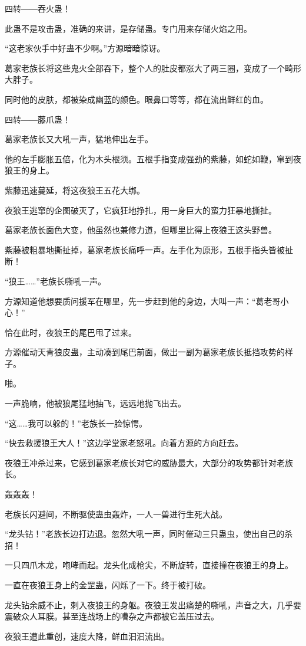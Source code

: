 \begin{this_body}
四转――吞火蛊！

此蛊不是攻击蛊，准确的来讲，是存储蛊。专门用来存储火焰之用。

“这老家伙手中好蛊不少啊。”方源暗暗惊讶。

葛家老族长将这些鬼火全部吞下，整个人的肚皮都涨大了两三圈，变成了一个畸形大胖子。

同时他的皮肤，都被染成幽蓝的颜色。眼鼻口等等，都在流出鲜红的血。

四转――藤爪蛊！

葛家老族长又大吼一声，猛地伸出左手。

他的左手膨胀五倍，化为木头根须。五根手指变成强劲的紫藤，如蛇如鞭，窜到夜狼王的身上。

紫藤迅速蔓延，将这夜狼王五花大绑。

夜狼王逃窜的企图破灭了，它疯狂地挣扎，用一身巨大的蛮力狂暴地撕扯。

葛家老族长面色大变，他虽然也兼修力道，但哪里比得上夜狼王这头野兽。

紫藤被粗暴地撕扯掉，葛家老族长痛呼一声。左手化为原形，五根手指头皆被扯断！

“狼王……”老族长嘶吼一声。

方源知道他想要质问援军在哪里，先一步赶到他的身边，大叫一声：“葛老哥小心！”

恰在此时，夜狼王的尾巴甩了过来。

方源催动天青狼皮蛊，主动凑到尾巴前面，做出一副为葛家老族长抵挡攻势的样子。

啪。

一声脆响，他被狼尾猛地抽飞，远远地抛飞出去。

“这……我可以躲的！”老族长一脸惊愕。

“快去救援狼王大人！”这边学堂家老怒吼。向着方源的方向赶去。

夜狼王冲杀过来，它感到葛家老族长对它的威胁最大，大部分的攻势都针对老族长。

轰轰轰！

老族长闪避间，不断驱使蛊虫轰炸，一人一兽进行生死大战。

“龙头钻！”老族长边打边退。忽然大吼一声，同时催动三只蛊虫，使出自己的杀招！

一只四爪木龙，咆哮而起。龙头化成枪尖，不断旋转，直接撞在夜狼王的身上。

一直在夜狼王身上的金罡蛊，闪烁了一下。终于被打破。

龙头钻余威不止，刺入夜狼王的身躯。夜狼王发出痛楚的嘶吼，声音之大，几乎要震破众人耳膜。甚至连战场上的嘈杂之声都被它盖压过去。

夜狼王遭此重创，速度大降，鲜血汩汩流出。


\end{this_body}
